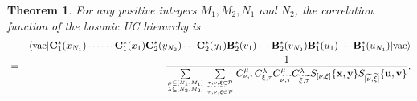\documentclass[10pt,a4paper]{amsart}
\numberwithin{equation}{section}
\newtheorem{theorem}{Theorem}[section]
\begin{document}
\begin{theorem}
For any positive integers $M_{1},M_{2},N_{1}$ and $N_{2}$, the correlation function of the bosonic UC hierarchy is
\begin{eqnarray}
&&\langle\text{vac}|\mathbf{C}^{\ast}_{1}(x_{N_{1}})
\cdots\cdots\mathbf{C}^{\ast}_{1}(x_{1})\mathbf{C}^{\ast}_{2}(y_{N_{2}})
\cdots\mathbf{C}^{\ast}_{2}(y_{1})\mathbf{B}^{\ast}_{2}(v_{1})\cdots
\mathbf{B}^{\ast}_{2}(v_{N_{2}})\mathbf{B}^{\ast}_{1}(u_{1})
\cdots\mathbf{B}^{\ast}_{1}(u_{N_{1}})|\text{vac}\rangle\notag\\
&=&\frac{1}{\sum\limits_{\mu\subseteq[N_{1},M_{1}]\atop{\lambda\subseteq[N_{2},M_{2}]}}
\sum\limits_{\tau,\nu,\xi\in\mathcal{P}\atop{\widetilde{\tau},\widetilde{\nu},
\widetilde{\xi}\in\mathcal{P}}}
C^{\mu}_{\nu,\tau}C^{\lambda}_{\xi,\tau}C^{\mu}_{\widetilde{\nu},\widetilde{\tau}}
C^{\lambda}_{\widetilde{\xi},\widetilde{\tau}}
S_{[\nu,\xi]}\{\mathbf{x},\mathbf{y}\}
S_{[\widetilde{\nu},\widetilde{\xi}]}\{\mathbf{u},\mathbf{v}\}}.
\end{eqnarray}
\end{theorem}
\end{document}

